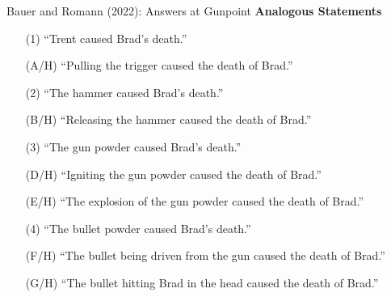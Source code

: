 \documentclass[xcolor=table,9pt,aspectratio=169]{beamer}
\begin{document}
\begin{frame}{\vspace*{10mm}Bauer and Romann (2022): Answers at Gunpoint}
\vspace*{-5mm}
\textbf{Analogous Statements}\\
\begin{itemize}
   \item[(1)] ``Trent caused Brad's death.''
   \item[(A/H)] ``Pulling the trigger caused the death of Brad.''
\end{itemize}
\vspace*{0.5em}
\begin{itemize}
   \item[(2)] ``The hammer caused Brad's death.''
   \item[(B/H)] ``Releasing the hammer caused the death of Brad.''
\end{itemize}
\vspace*{0.5em}
\begin{itemize}
   \item[(3)] ``The gun powder caused Brad's death.''
   \item[(D/H)] ``Igniting the gun powder caused the death of Brad.''
   \item[(E/H)] ``The explosion of the gun powder caused the death of Brad.''
\end{itemize}
\vspace*{0.5em}
\begin{itemize}
   \item[(4)] ``The bullet powder caused Brad's death.''
   \item[(F/H)] ``The bullet being driven from the gun caused the death of Brad.''
   \item[(G/H)] ``The bullet hitting Brad in the head caused the death of Brad.''
\end{itemize}
\end{frame}
\end{document}
